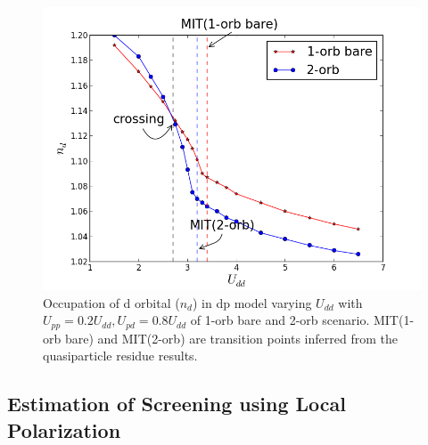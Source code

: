 \documentclass[10pt]{ruthesis}
\begin{document}
{\begin{figure}[H]
\begin{center}
 \includegraphics[width=0.85\columnwidth]{./plotForpublishing/nd_obto_dp.png}
 \caption{\label{figlast}Occupation of d orbital ($n_d$) in dp model varying $U_{dd}$ with $U_{pp}=0.2U_{dd},U_{pd}=0.8U_{dd}$ of 1-orb bare and 2-orb scenario. MIT(1-orb bare) and MIT(2-orb) are transition points inferred from the quasiparticle residue results.}
\end{center}
\end{figure}


\subsection{\label{Local Screening} Estimation of Screening using Local Polarization}

}
\end{document}
